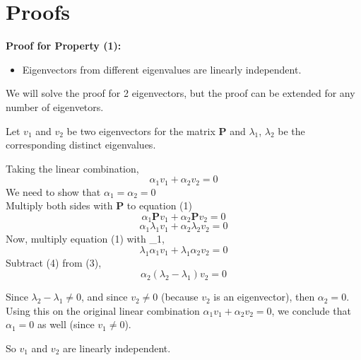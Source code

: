\documentclass{beamer}
\begin{document}
\section{Proofs}
\begin{frame}
\textbf{Proof for Property (1):}
\begin{itemize}
    \item Eigenvectors from different eigenvalues are linearly independent.
\end{itemize}
\vspace{10}
We will solve the proof for 2 eigenvectors, but the proof can be extended for any number of eigenvetors.
\vspace{10}

Let $v_{1}$ and $v_{2}$ be two eigenvectors for the matrix \textbf{P} and $\lambda_{1}$, $\lambda_{2}$ be the corresponding distinct eigenvalues.


\end{frame}

\begin{frame}
Taking the linear combination,
\begin{equation}
    \alpha_{1}v_{1} + \alpha_{2}v_{2} = 0
\end{equation}
We need to show that $\alpha_{1} = \alpha_{2} = 0$\\
Multiply both sides with \textbf{P} to equation (1)
\begin{equation}
    \alpha_{1}\textbf{P}v_{1} + \alpha_{2}\textbf{P}v_{2} = 0
\end{equation}
\begin{equation}
    \alpha_{1}\lambda_{1}v_{1} + \alpha_{2}\lambda_{2}v_{2} = 0
\end{equation}
Now, multiply equation (1) with \lambda_{1},\\
\begin{equation}
    \lambda_{1}\alpha_{1}v_{1} + \lambda_{1}\alpha_{2}v_{2} = 0
\end{equation}
Subtract (4) from (3),
\begin{equation}
    \alpha_{2}(\lambda_{2} - \lambda_{1})v_{2} = 0
\end{equation}
\end{frame}


\begin{frame}
Since $\lambda_{2} - \lambda_{1} \neq 0$, and since $v_{2} \neq 0$ (because $v_{2}$ is an eigenvector), then $\alpha_{2} = 0$.\\ 
\vspace{10}
Using this on the original linear combination $\alpha_{1}v_{1} + \alpha_{2}v_{2} = 0$, we conclude that $\alpha_{1} = 0$ as well (since $v_{1} \neq 0$).

\vspace{10}

So $v_{1}$ and $v_{2}$ are linearly independent.
\end{frame}
\end{document}
